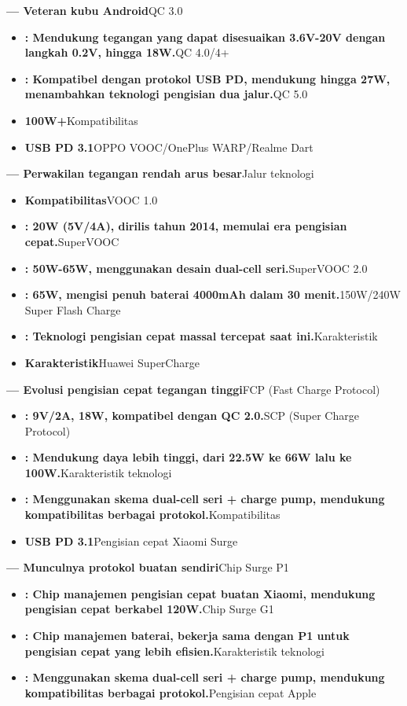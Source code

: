 \textbf{— Veteran kubu Android}QC 3.0

\begin{itemize}
  \item \textbf{: Mendukung tegangan yang dapat disesuaikan 3.6V-20V dengan langkah 0.2V, hingga 18W.}QC 4.0/4+
  \item \textbf{: Kompatibel dengan protokol USB PD, mendukung hingga 27W, menambahkan teknologi pengisian dua jalur.}QC 5.0
  \item \textbf{100W+}Kompatibilitas
  \item \textbf{USB PD 3.1}OPPO VOOC/OnePlus WARP/Realme Dart
\end{itemize}

\textbf{— Perwakilan tegangan rendah arus besar}Jalur teknologi

\begin{itemize}
  \item \textbf{Kompatibilitas}VOOC 1.0
  \item \textbf{: 20W (5V/4A), dirilis tahun 2014, memulai era pengisian cepat.}SuperVOOC
  \item \textbf{: 50W-65W, menggunakan desain dual-cell seri.}SuperVOOC 2.0
  \item \textbf{: 65W, mengisi penuh baterai 4000mAh dalam 30 menit.}150W/240W Super Flash Charge
  \item \textbf{: Teknologi pengisian cepat massal tercepat saat ini.}Karakteristik
  \item \textbf{Karakteristik}Huawei SuperCharge
\end{itemize}

\textbf{— Evolusi pengisian cepat tegangan tinggi}FCP (Fast Charge Protocol)

\begin{itemize}
  \item \textbf{: 9V/2A, 18W, kompatibel dengan QC 2.0.}SCP (Super Charge Protocol)
  \item \textbf{: Mendukung daya lebih tinggi, dari 22.5W ke 66W lalu ke 100W.}Karakteristik teknologi
  \item \textbf{: Menggunakan skema dual-cell seri + charge pump, mendukung kompatibilitas berbagai protokol.}Kompatibilitas
  \item \textbf{USB PD 3.1}Pengisian cepat Xiaomi Surge
\end{itemize}

\textbf{— Munculnya protokol buatan sendiri}Chip Surge P1

\begin{itemize}
  \item \textbf{: Chip manajemen pengisian cepat buatan Xiaomi, mendukung pengisian cepat berkabel 120W.}Chip Surge G1
  \item \textbf{: Chip manajemen baterai, bekerja sama dengan P1 untuk pengisian cepat yang lebih efisien.}Karakteristik teknologi
  \item \textbf{: Menggunakan skema dual-cell seri + charge pump, mendukung kompatibilitas berbagai protokol.}Pengisian cepat Apple
\end{itemize}

